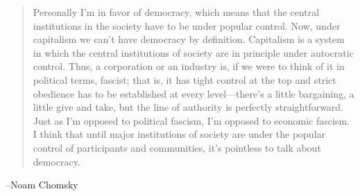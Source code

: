 \documentclass{exam}
\begin{document}
\begin{description}

    \pagebreak
  \end{description}
\else
  \vspace{8 cm}
    \begin{quote}
      Personally I'm in favor of democracy, which means that the central
      institutions in the society have to be under popular control. Now, under
      capitalism we can't have democracy by definition. Capitalism is a system in
      which the central institutions of society are in principle under autocratic
      control. Thus, a corporation or an industry is, if we were to think of it in
      political terms, fascist; that is, it has tight control at the top and
      strict obedience has to be established at every level---there's a little
      bargaining, a little give and take, but the line of authority is perfectly
      straightforward. Just as I'm opposed to political fascism, I'm opposed to
      economic fascism. I think that until major institutions of society are under
      the popular control of participants and communities, it's pointless to talk
      about democracy.
    \end{quote}
  \vspace{.2 cm}

  \hspace{1 cm} --Noam Chomsky
\fi
\end{document}
